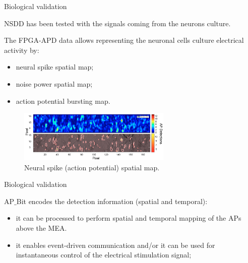 \documentclass{beamer}
\begin{document}
\begin{frame}{Biological validation}

NSDD has been tested with the signals coming from the neurons culture. 
\vspace{0.2cm}

The FPGA-APD data allows representing the neuronal cells culture electrical activity by:

\begin{itemize}
    \item neural spike spatial map;
    \item noise power spatial map;
    \item action potential bursting map.
\end{itemize}
\begin{figure}
             \includegraphics[width=0.65\textwidth]{images_Alice/spatial_map.png}
                \caption{Neural spike (action potential) spatial map.}
                \label{fig:spatial_map}
            \end{figure}
            
\end{frame}


\begin{frame}{Biological validation}

AP$\_$Bit encodes the detection information (spatial and temporal):
\begin{itemize}
    \item it can be processed to perform spatial and temporal mapping of the APs above the MEA.
    \item it enables event-driven communication and/or it can be used for instantaneous control of the electrical stimulation signal;
\end{itemize}

\end{frame}
\end{document}
